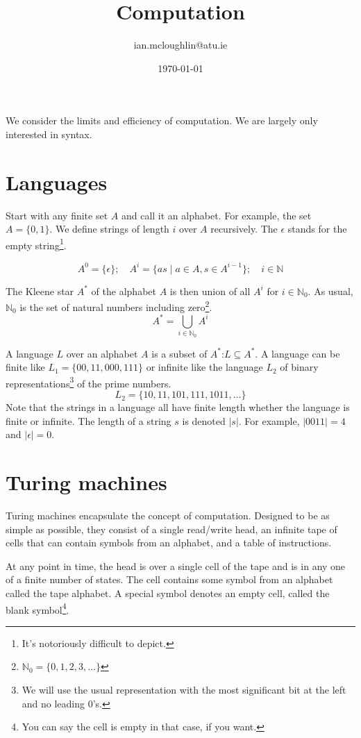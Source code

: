 \documentclass{iansnotes}
\title{Computation}
\author{ian.mcloughlin@atu.ie}
\date{\today}
\begin{document}
\maketitle
  We consider the limits and efficiency of computation.
  We are largely only interested in syntax.

\section{Languages}
  Start with any finite set $A$ and call it an alphabet.
  For example, the set $A = \{ 0, 1 \}$.
  We define strings of length \( i \) over \( A \) recursively.
  The $\epsilon$ stands for the empty string\footnote{It's notoriously difficult to depict.}.

  \[A^0 = \{ \epsilon \}; \quad A^{i} = \{ as \mid a \in A, s \in A^{i-1} \}; \quad i \in \mathbb{N}\]
  
  The Kleene star \( A^* \) of the alphabet \( A \) is then union of all \( A^i \) for \( i \in \mathbb{N}_0 \).
  As usual, \( \mathbb{N}_0 \) is the set of natural numbers including zero\footnote{\(\mathbb{N}_0 = \{ 0, 1, 2, 3, \ldots \}\)}.
  \[ A^* = \bigcup_{i \in \mathbb{N}_0} A^i\]

  A language \( L \) over an alphabet \( A \) is a subset of \( A^* \):\( L \subseteq A^* \).
  A language can be finite like $L_1 = \{00, 11, 000, 111 \}$ or infinite like the language $L_2$ of binary representations\footnote{We will use the usual representation with the most significant bit at the left and no leading 0's.} of the prime numbers.
  \[ L_2 = \{10, 11, 101, 111, 1011, \ldots \}\]
  Note that the strings in a language all have finite length whether the language is finite or infinite.
  The length of a string $s$ is denoted $|s|$.
  For example, $|0011| = 4$ and $|\epsilon| = 0$.

\section{Turing machines}
  Turing machines encapsulate the concept of computation.
  Designed to be as simple as possible, they consist of a single read/write head, an infinite tape of cells that can contain symbols from an alphabet, and a table of instructions.

  At any point in time, the head is over a single cell of the tape and is in any one of a finite number of states.
  The cell contains some symbol from an alphabet called the tape alphabet.
  A special symbol denotes an empty cell, called the blank symbol\footnote{You can say the cell is empty in that case, if you want.}.
\end{document}

